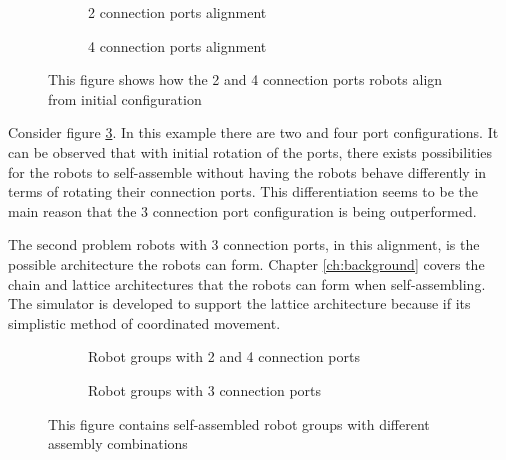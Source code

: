 \begin{figure}[H]
	\begin{subfigure}[t]{0.49\textwidth}
		\centering
		\caption{2 connection ports alignment}
		\label{2-port-guided-allignment}
	\end{subfigure}
	\begin{subfigure}[t]{0.49\textwidth}
		\centering
		\caption{4 connection ports alignment}
		\label{4-port-guided-allignment}
	\end{subfigure}
	\caption{This figure shows how the 2 and 4 connection ports robots align from initial configuration}
	\label{2-4-port-guided-allignment}
\end{figure}

Consider figure \ref{2-4-port-guided-allignment}.
In this example there are two and four port configurations.
It can be observed that with initial rotation of the ports, there exists possibilities for the robots to self-assemble without having the robots behave differently in terms of rotating their connection ports.
This differentiation seems to be the main reason that the 3 connection port configuration is being outperformed.

The second problem robots with 3 connection ports, in this alignment, is the possible architecture the robots can form.
Chapter \ref{ch:background} covers the chain and lattice architectures that the robots can form when self-assembling. %
The simulator is developed to support the lattice architecture because if its simplistic method of coordinated movement.

\begin{figure}[H]
	\begin{subfigure}[t]{0.49\textwidth}
		\centering
		\caption{Robot groups with 2 and 4 connection ports}
		\label{2-4-port-architecture}
	\end{subfigure}
	\begin{subfigure}[t]{0.49\textwidth}
		\centering
		\caption{Robot groups with 3 connection ports}
		\label{3-port-architecture}
	\end{subfigure}
	\caption{This figure contains self-assembled robot groups with different assembly combinations}
	\label{port-architectures}
\end{figure}




























